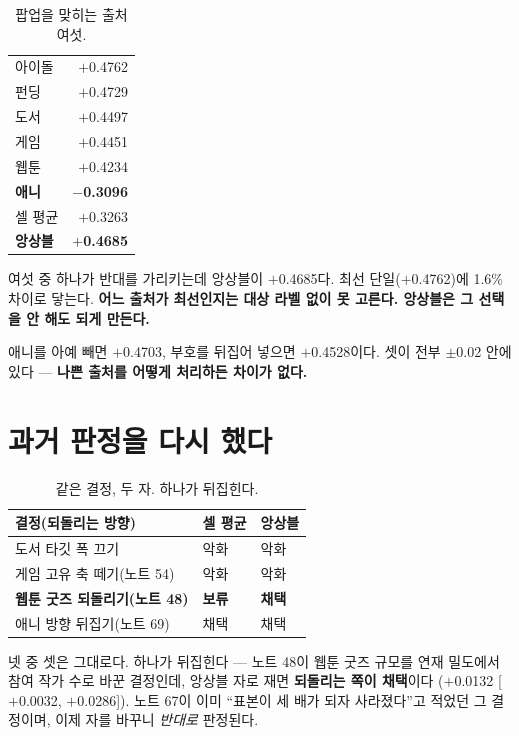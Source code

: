 \documentclass[10pt]{article}
\begin{document}
\begin{table}[t]
\centering\tsize
\caption{팝업을 맞히는 출처 여섯.}
\begin{tabular}{lr}
\toprule
아이돌 & $+$0.4762 \\
펀딩 & $+$0.4729 \\
도서 & $+$0.4497 \\
게임 & $+$0.4451 \\
웹툰 & $+$0.4234 \\
\textbf{애니} & \textbf{$-$0.3096} \\
\midrule
셀 평균 & $+$0.3263 \\
\textbf{앙상블} & \textbf{$+$0.4685} \\
\bottomrule
\end{tabular}
\end{table}

여섯 중 하나가 반대를 가리키는데 앙상블이 $+$0.4685다. 최선 단일($+$0.4762)에
1.6\% 차이로 닿는다. \textbf{어느 출처가 최선인지는 대상 라벨 없이 못 고른다.
앙상블은 그 선택을 안 해도 되게 만든다.}

애니를 아예 빼면 $+$0.4703, 부호를 뒤집어 넣으면 $+$0.4528이다. 셋이 전부
$\pm$0.02 안에 있다 --- \textbf{나쁜 출처를 어떻게 처리하든 차이가 없다.}

\section{과거 판정을 다시 했다}

\begin{table}[t]
\centering\tsize
\caption{같은 결정, 두 자. 하나가 뒤집힌다.}
\begin{tabular}{lll}
\toprule
결정(되돌리는 방향) & 셀 평균 & 앙상블 \\
\midrule
도서 타깃 폭 끄기 & 악화 & 악화 \\
게임 고유 축 떼기(노트 54) & 악화 & 악화 \\
\textbf{웹툰 굿즈 되돌리기(노트 48)} & \textbf{보류} & \textbf{채택} \\
애니 방향 뒤집기(노트 69) & 채택 & 채택 \\
\bottomrule
\end{tabular}
\end{table}

넷 중 셋은 그대로다. 하나가 뒤집힌다 --- 노트 48이 웹툰 굿즈 규모를 연재 밀도에서
참여 작가 수로 바꾼 결정인데, 앙상블 자로 재면 \textbf{되돌리는 쪽이 채택}이다
($+$0.0132 {[}$+$0.0032, $+$0.0286{]}). 노트 67이 이미 ``표본이 세 배가 되자
사라졌다''고 적었던 그 결정이며, 이제 자를 바꾸니 \emph{반대로} 판정된다.
\end{document}
